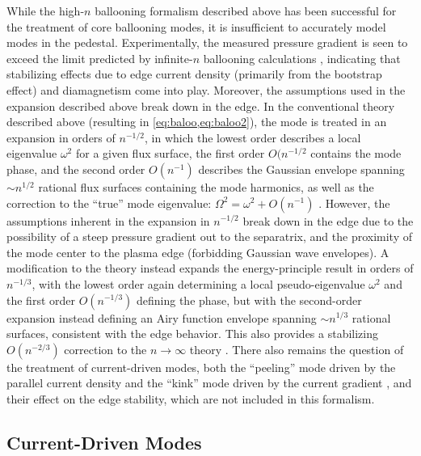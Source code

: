 While the high-$n$ ballooning formalism described above has been successful for the treatment of core ballooning modes, it is insufficient to accurately model modes in the pedestal.  Experimentally, the measured pressure gradient is seen to exceed the limit predicted by infinite-$n$ ballooning calculations \cite{Groebner1998a,Osborne1998}, indicating that stabilizing effects due to edge current density (primarily from the bootstrap effect) and diamagnetism come into play.  Moreover, the assumptions used in the expansion described above break down in the edge.  In the conventional theory \cite{Connor1978,Connor1979} described above (resulting in \cref{eq:baloo,eq:baloo2}), the mode is treated in an expansion in orders of $n^{-1/2}$, in which the lowest order describes a local eigenvalue $\omega^2$ for a given flux surface, the first order $O(n^{-1/2}$ contains the mode phase, and the second order $O(n^{-1})$ describes the Gaussian envelope spanning $\sim n^{1/2}$ rational flux surfaces containing the mode harmonics, as well as the correction to the ``true'' mode eigenvalue: $\Omega^2 = \omega^2 + O(n^{-1})$ \cite{Connor1998a,Wilson1999}.  However, the assumptions inherent in the expansion in $n^{-1/2}$ break down in the edge due to the possibility of a steep pressure gradient out to the separatrix, and the proximity of the mode center to the plasma edge (forbidding Gaussian wave envelopes).  A modification to the theory \cite{Connor1998a,Wilson1999} instead expands the energy-principle result in orders of $n^{-1/3}$, with the lowest order again determining a local pseudo-eigenvalue $\omega^2$ and the first order $O(n^{-1/3})$ defining the phase, but with the second-order expansion instead defining an Airy function envelope spanning $\sim n^{1/3}$ rational surfaces, consistent with the edge behavior.  This also provides a stabilizing $O(n^{-2/3})$ correction to the $n \rightarrow \infty$ theory \cite{Connor1998a}.  There also remains the question of the treatment of current-driven modes, both the ``peeling'' mode driven by the parallel current density and the ``kink'' mode driven by the current gradient \cite{Wilson2006}, and their effect on the edge stability, which are not included in this formalism.

\subsection{Current-Driven Modes}\label{subsec:mod_peel}

